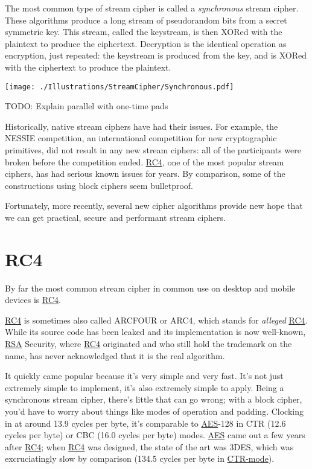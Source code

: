 \documentclass[11pt,ebook,table,dvipsnames]{memoir}
\begin{document}
The most common type of stream cipher is called a \emph{synchronous} stream
cipher. These algorithms produce a long stream of pseudorandom bits
from a secret symmetric key. This stream, called the keystream, is
then XORed with the plaintext to produce the ciphertext. Decryption is
the identical operation as encryption, just repeated: the keystream is
produced from the key, and is XORed with the ciphertext to produce the
plaintext.

\texttt{[image: ./Illustrations/StreamCipher/Synchronous.pdf]}

TODO: Explain parallel with one-time pads

Historically, native stream ciphers have had their issues. For
example, the NESSIE competition, an international competition for new
cryptographic primitives, did not result in any new stream ciphers:
all of the participants were broken before the competition ended. \hyperref[RC4]{RC4},
one of the most popular stream ciphers, has had serious known issues
for years. By comparison, some of the constructions using block
ciphers seem bulletproof.

Fortunately, more recently, several new cipher algorithms provide new
hope that we can get practical, secure and performant stream ciphers.
\section{\label{RC4}RC4}
\label{sec-2-3-11}

By far the most common \gls{stream cipher} in common use on desktop
and mobile devices is \hyperref[RC4]{RC4}.

\hyperref[RC4]{RC4} is sometimes also called ARCFOUR or ARC4, which stands for
\emph{alleged} \hyperref[RC4]{RC4}. While its source code has been leaked and its
implementation is now well-known, \hyperref[RSA]{RSA} Security, where \hyperref[RC4]{RC4} originated
and who still hold the trademark on the name, has never acknowledged
that it is the real algorithm.

It quickly came popular because it's very simple and very fast. It's
not just extremely simple to implement, it's also extremely simple to
apply. Being a synchronous stream cipher, there's little that can go
wrong; with a block cipher, you'd have to worry about things like
modes of operation and padding. Clocking in at around 13.9 cycles per
byte, it's comparable to \hyperref[AES]{AES}-128 in CTR (12.6 cycles per byte) or CBC
(16.0 cycles per byte) modes. \hyperref[AES]{AES} came out a few years after \hyperref[RC4]{RC4}; when
\hyperref[RC4]{RC4} was designed, the state of the art was 3DES, which was
excruciatingly slow by comparison (134.5 cycles per byte in \hyperref[CTR mode]{CTR-mode}).
\cite{cryptopp:bench}
\end{document}
